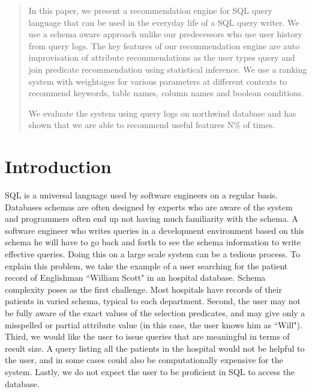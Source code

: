 \documentclass{acm_proc_article-sp}
\begin{document}
\maketitle
\begin{abstract}
In this paper, we present a recommendation engine for SQL query language that can be used in the everyday life of a SQL query writer. We use a schema aware approach unlike our predecessors who use user history from query logs.  The key features of our recommendation engine are auto improvisation of attribute recommendations as the user types query and join predicate recommendation using statistical inference. We use a ranking system with weightages for various parameters at different contexts to recommend keywords, table names, column names and boolean conditions.

We evaluate the system using query logs on northwind database and has shown that we are able to recommend useful features N\% of times.
\end{abstract}



\section{Introduction}
SQL is a universal language used by software engineers on a regular basis. Databases schemas are often designed by experts who are aware of the system and programmers often end up not having much familiarity with the schema. A software engineer who writes queries in a development environment based on this schema he will have to go back and forth to see the schema information to write effective queries. Doing this on a large scale system can be a tedious process. To explain this problem, we take the example of a user searching for the patient record of Englishman ``William Scott" in an hospital database. Schema complexity poses as the first challenge. Most hospitals have records of their patients in varied schema, typical to each department. Second, the user may not be fully aware of the exact values of the selection predicates, and may give only a misspelled or partial attribute value (in this case, the user knows him as ``Will"). Third, we would like the user to issue queries that are meaningful in terms of result size. A query listing all the patients in the hospital would not be helpful to the user, and in some cases could also be computationally expensive for the system. Lastly, we do not expect the user to be proficient in SQL to access the database. 
\end{document}
